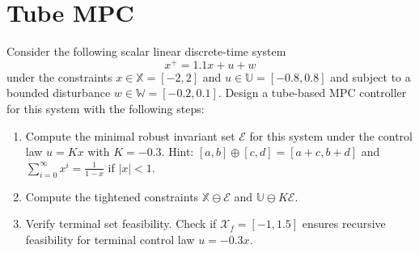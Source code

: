 \setcounter{section}{0}
\section{Tube MPC}

Consider the following scalar linear discrete-time system 
    \begin{equation*}
        x^+ = 1.1 x + u + w 
    \end{equation*}
under the constraints $x \in \mathbb{X} = [-2, 2]$ and $u \in \mathbb{U} = [-0.8, 0.8]$ and subject to a bounded disturbance $w \in \mathbb{W} = [-0.2,0.1]$. Design a tube-based MPC controller for this system with the following steps: 
\begin{enumerate}
    \item Compute the minimal robust invariant set $\mathcal{E}$ for this system under the control law $u = Kx$ with $K = -0.3$. 
    Hint: $[a,b] \oplus [c,d] = [a+c,b+d]$ and $\sum_{i=0}^{\infty}x^{i} = \frac{1}{1-x}$ if $|x| < 1$.

    \item Compute the tightened constraints $\mathbb{X} \ominus \mathcal{E}$ and $\mathbb{U} \ominus K\mathcal{E}$. 
    
    \item Verify terminal set feasibility. Check if $\mathcal{X}_{f} = [-1, 1.5]$ ensures recursive feasibility for terminal control law $u = -0.3x$. 
    

\end{enumerate}
